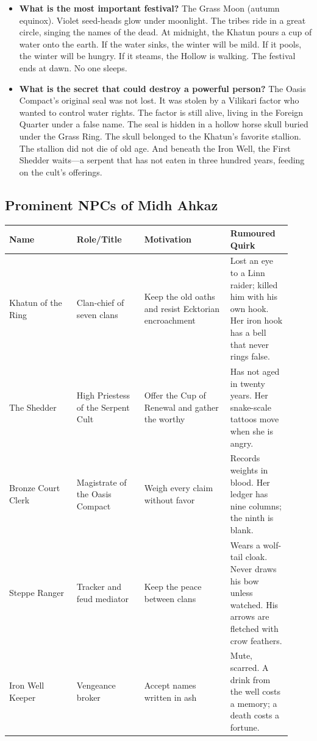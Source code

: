 {{\begin{itemize}
\item \textbf{What is the most important festival?} The Grass Moon (autumn equinox). Violet seed-heads glow under moonlight. The tribes ride in a great circle, singing the names of the dead. At midnight, the Khatun pours a cup of water onto the earth. If the water sinks, the winter will be mild. If it pools, the winter will be hungry. If it steams, the Hollow is walking. The festival ends at dawn. No one sleeps.
\item \textbf{What is the secret that could destroy a powerful person?} The Oasis Compact's original seal was not lost. It was stolen by a Vilikari factor who wanted to control water rights. The factor is still alive, living in the Foreign Quarter under a false name. The seal is hidden in a hollow horse skull buried under the Grass Ring. The skull belonged to the Khatun's favorite stallion. The stallion did not die of old age. And beneath the Iron Well, the First Shedder waits---a serpent that has not eaten in three hundred years, feeding on the cult's offerings.
\end{itemize}

\subsection*{Prominent NPCs of Midh Ahkaz}

\begin{tabular}{|p{0.22\linewidth}|p{0.22\linewidth}|p{0.28\linewidth}|p{0.2\linewidth}|}
\hline
\textbf{Name} & \textbf{Role/Title} & \textbf{Motivation} & \textbf{Rumoured Quirk} \\
\hline
Khatun of the Ring & Clan-chief of seven clans & Keep the old oaths and resist Ecktorian encroachment & Lost an eye to a Linn raider; killed him with his own hook. Her iron hook has a bell that never rings false. \\
\hline
The Shedder & High Priestess of the Serpent Cult & Offer the Cup of Renewal and gather the worthy & Has not aged in twenty years. Her snake-scale tattoos move when she is angry. \\
\hline
Bronze Court Clerk & Magistrate of the Oasis Compact & Weigh every claim without favor & Records weights in blood. Her ledger has nine columns; the ninth is blank. \\
\hline
Steppe Ranger & Tracker and feud mediator & Keep the peace between clans & Wears a wolf-tail cloak. Never draws his bow unless watched. His arrows are fletched with crow feathers. \\
\hline
Iron Well Keeper & Vengeance broker & Accept names written in ash & Mute, scarred. A drink from the well costs a memory; a death costs a fortune. \\
\hline
\end{tabular}

}}
